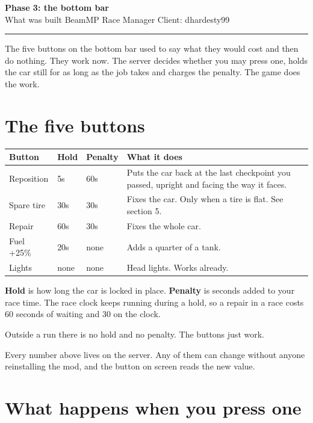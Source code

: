 \documentclass[11pt,a4paper]{article}
\begin{document}
\begin{center}
{\LARGE\bfseries Phase 3: the bottom bar}\\[4pt]
{\small What was built \quad BeamMP Race Manager \quad Client: dhardesty99}
\end{center}

\vspace{4pt}
\hrule
\vspace{8pt}

The five buttons on the bottom bar used to say what they would cost and then do
nothing. They work now. The server decides whether you may press one, holds the
car still for as long as the job takes and charges the penalty. The game does
the work.

\section{The five buttons}

\begin{longtable}{@{}p{26mm}p{14mm}p{16mm}p{68mm}@{}}
\toprule
\textbf{Button} & \textbf{Hold} & \textbf{Penalty} & \textbf{What it does} \\
\midrule
\endhead
Reposition & 5s & 60s  & Puts the car back at the last checkpoint you passed,
                         upright and facing the way it faces. \\
Spare tire & 30s & 30s & Fixes the car. Only when a tire is flat. See section 5. \\
Repair     & 60s & 30s & Fixes the whole car. \\
Fuel +25\% & 20s & none & Adds a quarter of a tank. \\
Lights     & none & none & Head lights. Works already. \\
\bottomrule
\end{longtable}

\textbf{Hold} is how long the car is locked in place. \textbf{Penalty} is
seconds added to your race time. The race clock keeps running during a hold, so
a repair in a race costs 60 seconds of waiting and 30 on the clock.

Outside a run there is no hold and no penalty. The buttons just work.

Every number above lives on the server. Any of them can change without anyone
reinstalling the mod, and the button on screen reads the new value.

\section{What happens when you press one}
\end{document}
